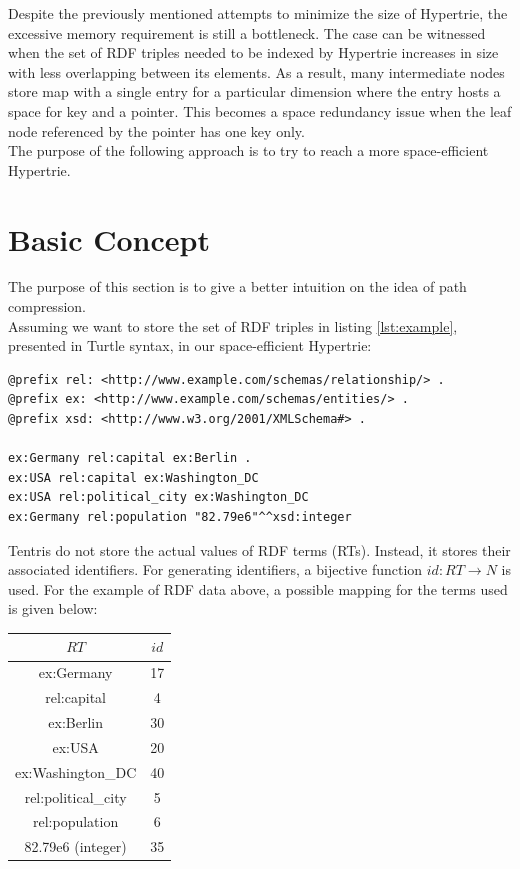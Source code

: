 Despite the previously mentioned attempts to minimize the size of Hypertrie, the excessive memory requirement is still a bottleneck. The case can be witnessed when the set of RDF triples needed to be indexed by Hypertrie increases in size with less overlapping between its elements. As a result, many intermediate nodes store map with a single entry for a particular dimension where the entry hosts a space for key and a pointer. This becomes a space redundancy issue when the leaf node referenced by the pointer has one key only. \\ 

The purpose of the following approach is to try to reach a more space-efficient Hypertrie.

\section{Basic Concept}

The purpose of this section is to give a better intuition on the idea of path compression.  \\

Assuming we want to store the set of RDF triples in listing \ref{lst:example}, presented in Turtle syntax, in our space-efficient Hypertrie: 

\begin{lstlisting}[caption={An example set of RDF triples},label={lst:example}]
@prefix rel: <http://www.example.com/schemas/relationship/> .
@prefix ex: <http://www.example.com/schemas/entities/> .
@prefix xsd: <http://www.w3.org/2001/XMLSchema#> .

ex:Germany rel:capital ex:Berlin .
ex:USA rel:capital ex:Washington_DC
ex:USA rel:political_city ex:Washington_DC
ex:Germany rel:population "82.79e6"^^xsd:integer	
\end{lstlisting}

Tentris do not store the actual values of RDF terms (RTs). Instead, it stores their associated identifiers. 
For generating identifiers, a bijective function $id: RT \to N$ is used. 
For the example of RDF data above, a possible mapping for the terms used is given below: \\

\begin{center}
	\begin{tabular}{ |c|c| } 
		\hline
		$RT$ & $id$ \\
		\hline
		ex:Germany & 17 \\ 
		rel:capital & 4 \\ 
		ex:Berlin & 30 \\ 
		ex:USA & 20 \\
		ex:Washington\_DC & 40 \\
		rel:political\_city & 5 \\
		rel:population & 6 \\
		82.79e6 (integer) & 35 \\
		\hline
	\end{tabular}
\end{center}

